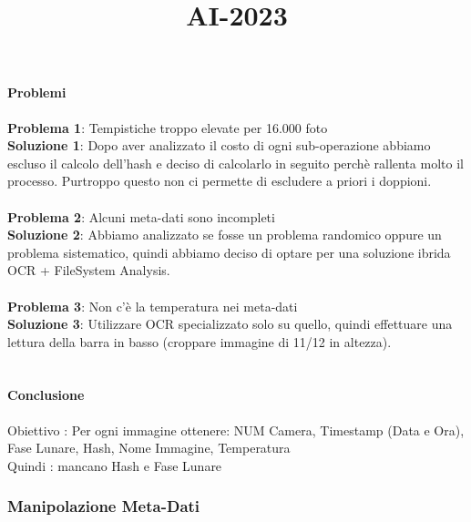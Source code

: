 \title{AI-2023}\documentclass[12pt,a4paper,twoside]{article}
\begin{document}
\paragraph{Problemi}
\textbf{Problema 1}: Tempistiche troppo elevate per 16.000 foto\\
\textbf{Soluzione 1}: Dopo aver analizzato il costo di ogni sub-operazione abbiamo escluso il calcolo 
dell'hash e deciso di calcolarlo in seguito perchè rallenta molto il processo. Purtroppo questo non ci 
permette di escludere a priori i doppioni.\\
\\
\textbf{Problema 2}: Alcuni meta-dati sono incompleti\\
\textbf{Soluzione 2}: Abbiamo analizzato se fosse un problema randomico oppure un problema sistematico, 
quindi abbiamo deciso di optare per una soluzione ibrida OCR + FileSystem Analysis.\\
\\
\textbf{Problema 3}: Non c'è la temperatura nei meta-dati\\
\textbf{Soluzione 3}: Utilizzare OCR specializzato solo su quello, quindi effettuare una lettura della 
barra in basso (croppare immagine di 11/12 in altezza).\\
\\

\paragraph{Conclusione}
Obiettivo : Per ogni immagine ottenere: NUM Camera, Timestamp (Data e Ora), Fase Lunare, Hash, Nome
Immagine, Temperatura\\
Quindi : mancano Hash e Fase Lunare

\subsubsection{Manipolazione Meta-Dati}
\end{document}
